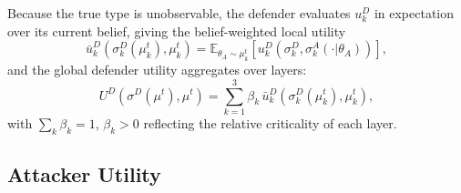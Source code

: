 \documentclass[conference]{IEEEtran}
\newcommand{\E}{\mathbb{E}}
\begin{document}
Because the true type is unobservable, the defender evaluates $u_k^D$ in
expectation over its current belief, giving the belief-weighted local utility
\begin{equation}
\bar{u}_k^D\!\left(\sigma_k^D(\mu_k^t),\mu_k^t\right) =
\E_{\theta_A\sim\mu_k^t}\!\left[u_k^D\!\left(\sigma_k^D,
\sigma_k^A(\cdot|\theta_A)\right)\right],
\end{equation}
and the global defender utility aggregates over layers:
\begin{equation}
U^D(\sigma^D(\mu^t),\mu^t) = \sum_{k=1}^3 \beta_k\,
\bar{u}_k^D\!\left(\sigma_k^D(\mu_k^t),\mu_k^t\right),
\label{eq:util_D_global}
\end{equation}
with $\sum_k\beta_k=1$, $\beta_k>0$ reflecting the relative criticality of each
layer.

\subsection{Attacker Utility}
\end{document}
